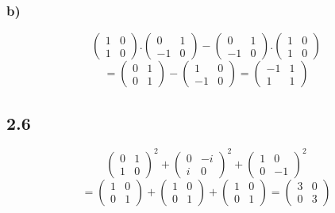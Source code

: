\documentclass[11pt]{article}
\begin{document}
\subsubsection*{b)}
\[
\begin{pmatrix}
1 & 0 \\
1 & 0
\end{pmatrix}
.
\begin{pmatrix}
0 & 1\\
-1 & 0
\end{pmatrix}
-
\begin{pmatrix}
0 & 1\\
-1 & 0
\end{pmatrix}
.
\begin{pmatrix}
1 & 0 \\
1 & 0
\end{pmatrix}
\]
\[
=
\begin{pmatrix}
0 & 1\\
0 & 1
\end{pmatrix}
-
\begin{pmatrix}
1 & 0 \\
-1 & 0
\end{pmatrix}
=
\begin{pmatrix}
-1 & 1 \\
1 & 1
\end{pmatrix}
\]

\subsection*{2.6}
\[
\begin{pmatrix}
0 & 1 \\
1 & 0
\end{pmatrix}^2
+
\begin{pmatrix}
0 & -i \\
i & 0
\end{pmatrix}^2
+
\begin{pmatrix}
1 & 0 \\
0 & -1
\end{pmatrix}^2
\]
\[
=
\begin{pmatrix}
1 & 0 \\
0 & 1
\end{pmatrix}
+
\begin{pmatrix}
1 & 0 \\
0 & 1
\end{pmatrix}
+
\begin{pmatrix}
1 & 0 \\
0 & 1
\end{pmatrix}
=
\begin{pmatrix}
3 & 0 \\
0 & 3
\end{pmatrix}
\]
\end{document}
